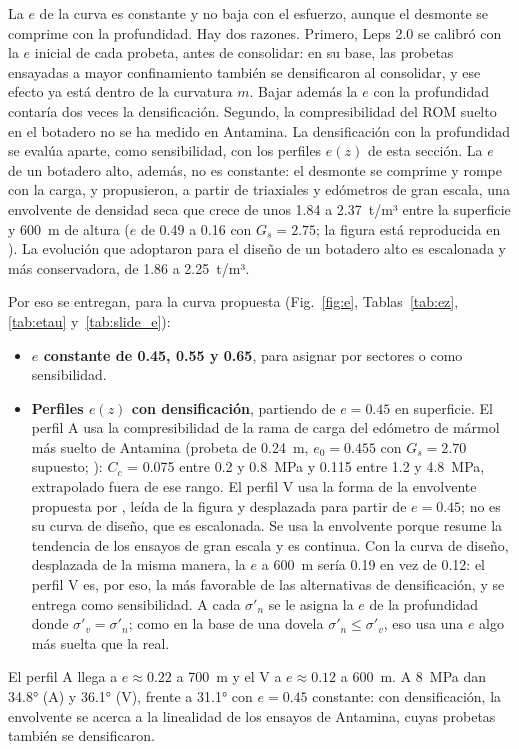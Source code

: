 \documentclass[11pt,letterpaper]{article}
\begin{document}
La $e$ de la curva es constante y no baja con el esfuerzo, aunque el desmonte se comprime con la profundidad. Hay dos razones. Primero, Leps 2.0 se calibró con la $e$ inicial de cada probeta, antes de consolidar: en su base, las probetas ensayadas a mayor confinamiento también se densificaron al consolidar, y ese efecto ya está dentro de la curvatura $m$. Bajar además la $e$ con la profundidad contaría dos veces la densificación. Segundo, la compresibilidad del ROM suelto en el botadero no se ha medido en Antamina. La densificación con la profundidad se evalúa aparte, como sensibilidad, con los perfiles $e(z)$ de esta sección.
 La $e$ de un botadero alto, además, no es constante: el desmonte se comprime y rompe con la carga, y \citet[Fig.~10]{valenzuela2008} propusieron, a partir de triaxiales y edómetros de gran escala, una envolvente de densidad seca que crece de unos 1.84 a 2.37~t/m³ entre la superficie y 600~m de altura ($e$ de 0.49 a 0.16 con $G_s = 2.75$; la figura está reproducida en \citealp[Fig.~5.6]{hc2017}). La evolución que adoptaron para el diseño de un botadero alto es escalonada y más conservadora, de 1.86 a 2.25~t/m³.

Por eso se entregan, para la curva propuesta (Fig.~\ref{fig:e}, Tablas~\ref{tab:ez}, \ref{tab:etau} y~\ref{tab:slide_e}):
\begin{itemize}
\item \textbf{$e$ constante de 0.45, 0.55 y 0.65}, para asignar por sectores o como sensibilidad.
\item \textbf{Perfiles $e(z)$ con densificación}, partiendo de $e = 0.45$ en superficie. El perfil A usa la compresibilidad de la rama de carga del edómetro de mármol más suelto de Antamina (probeta de 0.24~m, $e_0 = 0.455$ con $G_s = 2.70$ supuesto; \citealp{w2022}): $C_c$ = 0.075 entre 0.2 y 0.8~MPa y 0.115 entre 1.2 y 4.8~MPa, extrapolado fuera de ese rango. El perfil V usa la forma de la envolvente propuesta por \citet{valenzuela2008}, leída de la figura y desplazada para partir de $e = 0.45$; no es su curva de diseño, que es escalonada. Se usa la envolvente porque resume la tendencia de los ensayos de gran escala y es continua. Con la curva de diseño, desplazada de la misma manera, la $e$ a 600~m sería 0.19 en vez de 0.12: el perfil V es, por eso, la más favorable de las alternativas de densificación, y se entrega como sensibilidad. A cada $\sigma'_n$ se le asigna la $e$ de la profundidad donde $\sigma'_v = \sigma'_n$; como en la base de una dovela $\sigma'_n \le \sigma'_v$, eso usa una $e$ algo más suelta que la real.
\end{itemize}
El perfil A llega a $e \approx 0.22$ a 700~m y el V a $e \approx 0.12$ a 600~m. A 8~MPa dan 34.8° (A) y 36.1° (V), frente a 31.1° con $e = 0.45$ constante: con densificación, la envolvente se acerca a la linealidad de los ensayos de Antamina, cuyas probetas también se densificaron.
\end{document}
